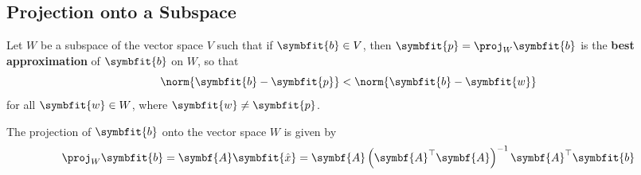 \documentclass{article}
\begin{document}
\subsection{Projection onto a Subspace}
\begin{theorem}
    Let \(W\) be a subspace of the vector space \(V\) such that if
    \(\symbfit{b}\in V\), then \(\symbfit{p}=\proj_{W}\symbfit{b}\) is
    the \textbf{best approximation} of \(\symbfit{b}\) on \(W\), so that
    \begin{equation*}
        \norm{\symbfit{b}-\symbfit{p}}<\norm{\symbfit{b}-\symbfit{w}}
    \end{equation*}
    for all \(\symbfit{w}\in W\), where \(\symbfit{w}\neq \symbfit{p}\).
\end{theorem}
\begin{theorem}
    The projection of \(\symbfit{b}\) onto the vector space \(W\) is
    given by
    \begin{equation*}
        \proj_{W}\symbfit{b} = \symbf{A}\symbfit{\hat{x}} = \symbf{A}\left( \symbf{A}^\top \symbf{A} \right)^{-1}\symbf{A}^\top \symbfit{b}
    \end{equation*}
\end{theorem}
\end{document}
